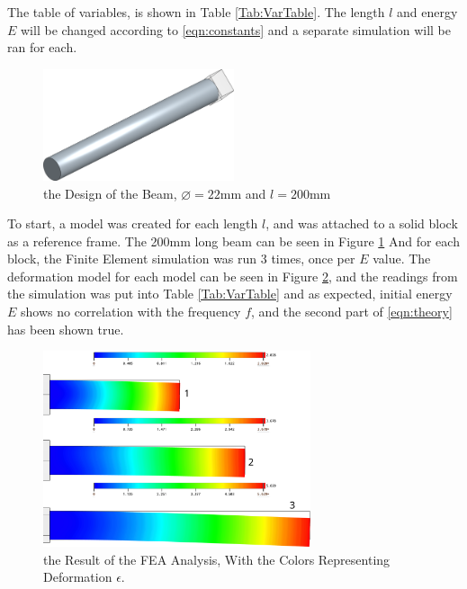 \documentclass[a4paper,12pt]{article}
\begin{document}
    The table of variables, is shown in Table \ref{Tab:VarTable}. The length $l$ and energy $E$ will be changed according to \eqref{eqn:constants} and a separate simulation will be ran for each.
    \begin{figure}[H]%
    \includegraphics[width=0.5\textwidth]{CADPic}
    \centering
    \caption{the Design of the Beam, $\diameter=22$mm and $l=200$mm}\label{fig:CADPic}
    \centering
    \end{figure}
    To start, a model was created for each length $l$, and was attached to a solid block as a reference frame. The 200mm long beam can be seen in Figure \ref{fig:CADPic}
    And for each block, the Finite Element simulation was run 3 times, once per $E$ value.
    The deformation model for each model can be seen in Figure \ref{fig:FEAPic}, and the readings from the simulation was put into Table \ref{Tab:VarTable} and as expected, initial energy $E$ shows no correlation with the frequency $f$, and the second part of \eqref{eqn:theory} has been shown true.
    \begin{figure}[H]%
    \includegraphics[width=0.7\textwidth]{FEA3}
    \centering
    \caption{the Result of the FEA Analysis, With the Colors Representing Deformation $\epsilon$.}\label{fig:FEAPic}
    \centering
    \end{figure}
\end{document}
